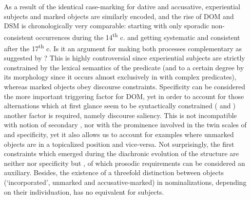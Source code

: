 \documentclass[output=paper]{LSP/langsci}
\begin{document}
As a result of the identical case-marking for dative and accusative, experiential subjects and marked objects are similarly encoded, and the rise of DOM and DSM is chronologically very comparable: starting with only sporadic non-consistent occurrences during the 14\textsuperscript{th} c. and getting systematic and consistent after the 17\textsuperscript{th} c. Is it an argument for making both processes complementary as suggested by \citet{Aissen2003Differential}? This is highly controversial since experiential subjects are strictly constrained by the lexical semantics of the predicate (and to a certain degree by its morphology since it occurs almost exclusively in  with complex predicates), whereas marked objects obey discourse constraints. Specificity can be considered the more important triggering factor for DOM, yet in order to account for those alternations which at first glance seem to be syntactically constrained ( and ) another factor is required, namely discourse saliency. This is not incompatible with  notion of secondary , nor with the prominence involved in the twin scales of  and specificity, yet it also allows us to account for examples where unmarked objects are in a topicalized position and vice-versa. Not surprisingly, the first constraints which emerged during the diachronic evolution of the structure are neither  nor specificity but , of which prosodic requirements can be considered an auxiliary. Besides, the existence of a threefold distinction between objects (‘incorporated’, unmarked and accusative-marked) in nominalizations, depending on their individuation, has no equivalent for subjects.
\end{document}

